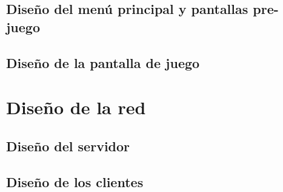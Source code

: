 \documentclass{article}
\begin{document}
\subsection{Diseño del menú principal y pantallas pre-juego}

\subsection{Diseño de la pantalla de juego}


\section{Diseño de la red}

\subsection{Diseño del servidor}

\subsection{Diseño de los clientes}
\end{document}
